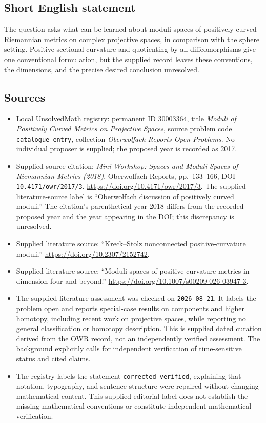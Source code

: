\documentclass[11pt]{article}
\begin{document}
\subsection{Short English statement}
The question asks what can be learned about moduli spaces of positively curved Riemannian metrics on complex projective spaces, in comparison with the sphere setting. Positive sectional curvature and quotienting by all diffeomorphisms give one conventional formulation, but the supplied record leaves these conventions, the dimensions, and the precise desired conclusion unresolved.
\subsection{Sources}
\begin{itemize}
\item Local UnsolvedMath registry: permanent ID \(30003364\), title \emph{Moduli of Positively Curved Metrics on Projective Spaces}, source problem code \texttt{catalogue entry}, collection \emph{Oberwolfach Reports Open Problems}. No individual proposer is supplied; the proposed year is recorded as 2017.
\item Supplied source citation: \emph{Mini-Workshop: Spaces and Moduli Spaces of Riemannian Metrics (2018)}, Oberwolfach Reports, pp.\ 133--166, DOI \texttt{10.4171/owr/2017/3}. \url{https://doi.org/10.4171/owr/2017/3}. The supplied literature-source label is ``Oberwolfach discussion of positively curved moduli.'' The citation's parenthetical year 2018 differs from the recorded proposed year and the year appearing in the DOI; this discrepancy is unresolved.
\item Supplied literature source: ``Kreck--Stolz nonconnected positive-curvature moduli.'' \url{https://doi.org/10.2307/2152742}.
\item Supplied literature source: ``Moduli spaces of positive curvature metrics in dimension four and beyond.'' \url{https://doi.org/10.1007/s00209-026-03947-3}.
\item The supplied literature assessment was checked on \texttt{2026-08-21}. It labels the problem open and reports special-case results on components and higher homotopy, including recent work on projective spaces, while reporting no general classification or homotopy description. This is supplied dated curation derived from the OWR record, not an independently verified assessment. The background explicitly calls for independent verification of time-sensitive status and cited claims.
\item The registry labels the statement \texttt{corrected\_verified}, explaining that notation, typography, and sentence structure were repaired without changing mathematical content. This supplied editorial label does not establish the missing mathematical conventions or constitute independent mathematical verification.
\end{itemize}
\end{document}
